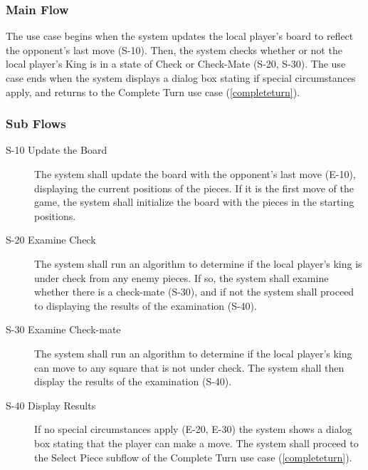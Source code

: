 \subsubsection{Main Flow} 
The use case begins when the system updates the local player's board to reflect the opponent's last move (S-10). Then, the system checks whether or not the local player's King is in a state of Check or Check-Mate (S-20, S-30). The use case ends when the system displays a dialog box stating if special circumstances apply, and returns to the Complete Turn use case (\ref{completeturn}).
\subsubsection{Sub Flows}
\begin{description}
\item[S-10 Update the Board] The system shall update the board with the opponent's last move (E-10), displaying the current positions of the pieces.  If it is the first move of the game, the system shall initialize the board with the pieces in the starting positions.
\item[S-20 Examine Check] The system shall run an algorithm to determine if the local player’s king is under check from any enemy pieces.  If so, the system shall examine whether there is a check-mate (S-30), and if not the system shall proceed to displaying the results of the examination (S-40).
\item[S-30 Examine Check-mate] The system shall run an algorithm to determine if the local player’s king can move to any square that is not under check.  The system shall then display the results of the examination (S-40).
\item[S-40 Display Results] If no special circumstances apply (E-20, E-30) the system shows a dialog box stating that the player can make a move.  The system shall proceed to the Select Piece subflow of the Complete Turn use case (\ref{completeturn}). 
\end{description}

